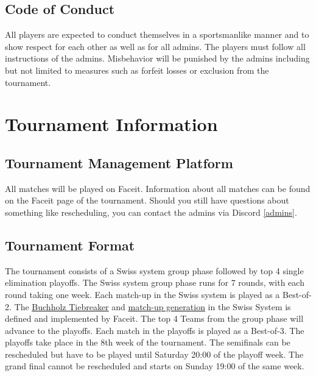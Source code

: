 \documentclass{article}
\begin{document}
\subsection{Code of Conduct}
All players are expected to conduct themselves in a sportsmanlike manner and to show respect for each other
as well as for all admins. The players must follow all instructions of the admins. Misbehavior will be punished by the admins 
including but not limited to measures such as forfeit losses or exclusion from the tournament.

\section{Tournament Information}
\subsection{Tournament Management Platform}
All matches will be played on Faceit. Information about all matches can be found on the Faceit page of the tournament. Should 
you still have questions about something like rescheduling, you can contact the admins via Discord \ref{admins}. 

\subsection{Tournament Format}
The tournament consists of a Swiss system group phase followed by top 4 single elimination playoffs. The Swiss system group phase runs for 7 rounds, with each round taking one week. Each match-up in the Swiss system is played as a Best-of-2. The \href{https://support.faceit.com/hc/en-us/articles/360003297299-What-are-tiebreakers-}{Buchholz Tiebreaker} and \href{https://web.archive.org/web/20210410142913/https://support.faceit.com/hc/en-us/articles/360010288440-Swiss-system-tournaments}{match-up generation} in the Swiss System is defined and implemented by Faceit.
The top 4 Teams from the group phase will advance to the playoffs. Each match in the playoffs is played as a Best-of-3. The playoffs take place in the 8th week of the tournament. The semifinals can be rescheduled but have to be played until Saturday 20:00 of the playoff week. The grand final cannot be rescheduled and starts on Sunday 19:00 of the same week.
\end{document}
